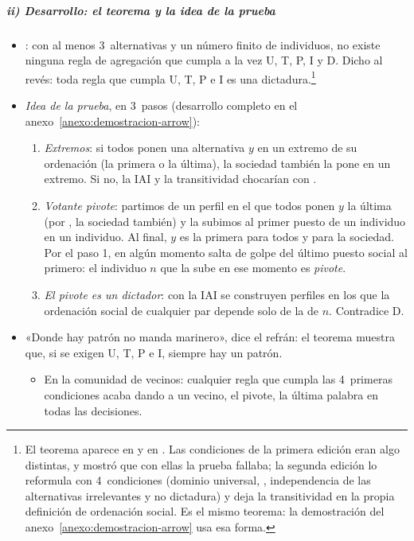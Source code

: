 \documentclass[11pt]{article}
\begin{document}
\subparagraph{ii) Desarrollo: el teorema y la idea de la prueba}

\begin{itemize}
\item {}: con al menos 3~alternativas y un número finito de individuos, no existe ninguna regla de agregación que cumpla a la vez U, T, P, I y D. Dicho al revés: toda regla que cumpla U, T, P e I es una dictadura.\footnote{El teorema aparece en \textcite{Arrow1950Difficulty} y en \textcite{Arrow1951Social}. Las condiciones de la primera edición eran algo distintas, y \textcite{Blau1957Existence} mostró que con ellas la prueba fallaba; la segunda edición\nocite{Arrow1963Social} lo reformula con 4~condiciones (dominio universal, , independencia de las alternativas irrelevantes y no dictadura) y deja la transitividad en la propia definición de ordenación social\nocite{Morreau2025Arrow}. Es el mismo teorema: la demostración del anexo~\ref{anexo:demostracion-arrow} usa esa forma.}
\item \emph{Idea de la prueba}\nocite{Geanakoplos2005Three}, en 3~pasos (desarrollo completo en el anexo~\ref{anexo:demostracion-arrow}):
  \begin{enumerate}
  \item \emph{Extremos}: si todos ponen una alternativa $y$ en un extremo de su ordenación (la primera o la última), la sociedad también la pone en un extremo. Si no, la IAI y la transitividad chocarían con .
  \item \emph{Votante pivote}: partimos de un perfil en el que todos ponen $y$ la última (por , la sociedad también) y la subimos al primer puesto de un individuo en un individuo. Al final, $y$ es la primera para todos y para la sociedad. Por el paso 1, en algún momento salta de golpe del último puesto social al primero: el individuo $n$ que la sube en ese momento es \emph{pivote}.
  \item \emph{El pivote es un dictador}: con la IAI se construyen perfiles en los que la ordenación social de cualquier par depende solo de la de $n$. Contradice D.
  \end{enumerate}
\item «Donde hay patrón no manda marinero», dice el refrán: el teorema muestra que, si se exigen U, T, P e I, siempre hay un patrón.
  \begin{itemize}
  \item En la comunidad de vecinos: cualquier regla que cumpla las 4~primeras condiciones acaba dando a un vecino, el pivote, la última palabra en todas las decisiones.
  \end{itemize}
\end{itemize}
\end{document}
